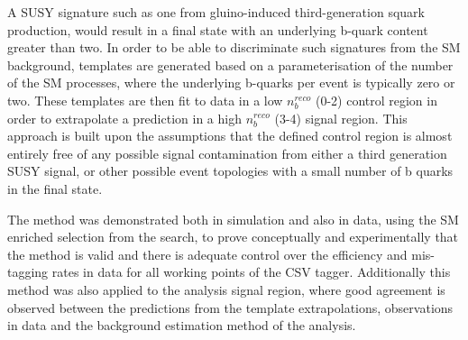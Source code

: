 A \ac{SUSY} signature such as one from gluino-induced third-generation squark production, would result in a final state with an underlying b-quark content greater than two. In order to be able to discriminate such signatures from the \ac{SM} background, templates are generated based on a parameterisation of the number of the \ac{SM} processes, where the underlying b-quarks per event is typically zero or two. These templates are then fit to data in a low $n_{b}^{reco}$ (0-2) control region in order to extrapolate a prediction in a high $n_{b}^{reco}$ (3-4) signal region. This approach is built upon the assumptions that the defined control region is almost entirely free of any possible signal contamination from either a third generation \ac{SUSY} signal, or other possible event topologies with a small number of b quarks in the final state.

The method was demonstrated both in simulation and also in data, using the \ac{SM} enriched \mupjets selection from the \alphat search, to prove conceptually and experimentally that the method is valid and there is adequate control over the efficiency and mis-tagging rates in data for all working points of the \ac{CSV} tagger. Additionally this method was also applied to the \alphat analysis signal region, where good agreement is observed between the predictions from the template extrapolations, observations in data and the background estimation method of the \alphat analysis.

